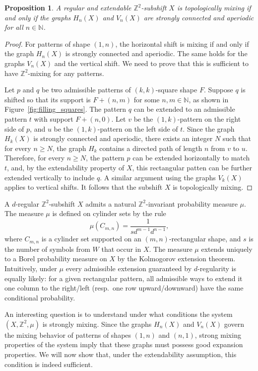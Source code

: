 \documentclass[12pt]{article}
\newtheorem{proposition}[theorem]{Proposition}
\theoremstyle{definition}
\begin{document}
\begin{proposition}
A regular and extendable $\mathbb{Z}^2$-subshift $X$ is topologically mixing if and only if the graphs $H_n(X)$ and $V_n(X)$ are strongly connected and aperiodic for all $n\in\mathbb{N}$.
\end{proposition}
\begin{proof}
For patterns of shape $(1,n)$, the horizontal shift is mixing if and only if the graph $H_n(X)$ is strongly connected and aperiodic. The same holds for the graphs $V_n(X)$ and the vertical shift. We need to prove that this is sufficient to have $\mathbb{Z}^2$-mixing for any patterns.

Let $p$ and $q$ be two admissible patterns of $(k,k)$-square shape $F$. Suppose $q$ is shifted so that its support is $F+(n,m)$ for some $n,m\in\mathbb{N}$, as shown in Figure~\ref{fig:filling_squares}. The pattern $q$ can be extended to an admissible pattern $t$ with support $F+(n,0)$.
Let $v$ be the $(1,k)$-pattern on the right side of $p$, and $u$ be the $(1,k)$-pattern on the left side of $t$. Since the graph $H_k(X)$ is strongly connected and aperiodic, there exists an integer $N$ such that for every $n\geq N$, the graph $H_k$ contains a directed path of length $n$ from $v$ to $u$. Therefore, for every $n\geq N$, the pattern $p$ can be extended horizontally to match $t$, and, by the extendability property of $X$, this rectangular patten can be further extended vertically to include $q$. A similar argument using the graphs $V_k(X)$ applies to vertical shifts. It follows that the subshift $X$ is topologically mixing.
\end{proof}

A $d$-regular $\mathbb{Z}^2$-subshift $X$ admits a natural $\mathbb{Z}^2$-invariant probability measure $\mu$. The measure $\mu$ is defined on cylinder sets by the rule
\[
\mu(C_{m,n})=\frac{1}{sd^{m-1}d^{n-1}},
\]
where $C_{m,n}$ is a cylinder set supported on an $(m,n)$-rectangular shape, and $s$ is the number of symbols from $W$ that occur in $X$. The measure $\mu$ extends uniquely to a Borel probability measure on $X$ by the Kolmogorov extension theorem.
Intuitively, under $\mu$ every admissible extension guaranteed by $d$-regularity is equally likely: for a given rectangular pattern, all admissible ways to extend it one column to the right/left (resp.\ one row upward/downward) have the same conditional probability.


An interesting question is to understand under what conditions the system $(X,\mathbb{Z}^2,\mu)$ is strongly mixing. Since the graphs $H_n(X)$ and $V_n(X)$ govern the mixing behavior of patterns of shapes $(1,n)$ and $(n,1)$, strong mixing properties of the system imply that these graphs must possess good expansion properties.
We will now show that, under the extendability assumption, this condition is indeed sufficient.
\end{document}

